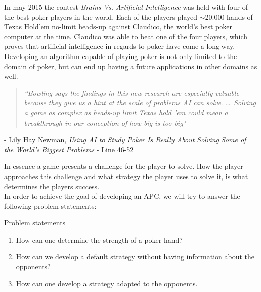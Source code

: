 In may 2015 the contest \textit{Brains Vs. Artificial Intelligence} \cite{brain-vs-ai} was held with four of the best poker players in the world. Each of the players played $\sim$20.000 hands of Texas Hold'em no-limit heads-up against Claudico, the world's best poker computer at the time. Claudico was able to beat one of the four players, which proves that artificial intelligence in regards to poker have come a long way.\\

Developing an algorithm capable of playing poker is not only limited to the domain of poker, but can end up having a future applications in other domains as well.

\newcommand{\chapquote}[4]{\begin{quotation} \textit{#1} \end{quotation} \begin{flushright} - #2, \textit{#3} -  #4\end{flushright} }

\chapquote{``Bowling says the findings in this new research are especially valuable because they give us a hint at the scale of problems AI can solve. \ldots ~Solving a game as complex as heads-up limit Texas hold ’em could mean a breakthrough in our conception of how big is too big"}{Lily Hay Newman}{Using AI to Study Poker Is Really About Solving Some of the World’s Biggest Problems}{Line 46-52}

In essence a game presents a challenge for the player to solve. How the player approaches this challenge and what strategy the player uses to solve it, is what determines the players success.\\

In order to achieve the goal of developing an APC, we will try to answer the following problem statements:

\vspace{4mm}
\begin{statementBox2}{Problem statements}
\begin{enumerate}
    \item \label{itm:q1} How can one determine the strength of a poker hand? \label{itm:ps1}
    \item \label{itm:q2} How can we develop a default strategy without having information about the opponents? \label{itm:ps2}
    \item \label{itm:q3} How can one develop a strategy adapted to the opponents. \label{itm:ps3}
  \end{enumerate}
\end{statementBox2}
\vspace{4mm}

